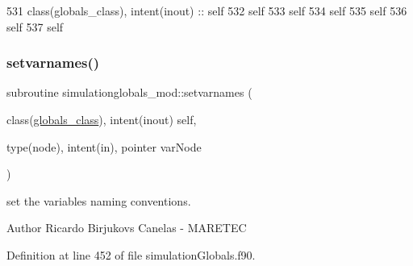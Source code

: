 \begin{DoxyCode}
531     \textcolor{keywordtype}{class}(globals\_class), \textcolor{keywordtype}{intent(inout)} :: self
532     self%
533     self%
534     self%
535     self%
536     self%
537     self%
\end{DoxyCode}
\mbox{\label{namespacesimulationglobals__mod_a2c6fa0a9123d06b2110258ea200f4f52}} 
\subsubsection{\texorpdfstring{setvarnames()}{setvarnames()}}
{\footnotesize\ttfamily subroutine simulationglobals\+\_\+mod\+::setvarnames (\begin{DoxyParamCaption}\item[{class(\mbox{\hyperlink{structsimulationglobals__mod_1_1globals__class}{globals\+\_\+class}}), intent(inout)}]{self,  }\item[{type(node), intent(in), pointer}]{var\+Node }\end{DoxyParamCaption})\hspace{0.3cm}{\ttfamily [private]}}



set the variables naming conventions. 

\begin{DoxyAuthor}{Author}
Ricardo Birjukovs Canelas -\/ M\+A\+R\+E\+T\+EC 
\end{DoxyAuthor}


Definition at line 452 of file simulation\+Globals.\+f90.


